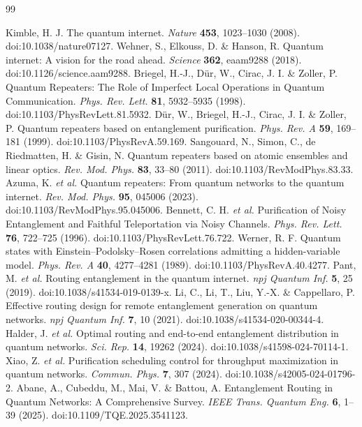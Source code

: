 \documentclass[pdflatex,sn-nature]{sn-jnl}
\theoremstyle{plain}
\theoremstyle{remark}
\begin{document}
\begin{thebibliography}{99}

 Kimble, H. J. The quantum internet. \textit{Nature} \textbf{453}, 1023--1030 (2008). doi:10.1038/nature07127.
 Wehner, S., Elkouss, D. \& Hanson, R. Quantum internet: A vision for the road ahead. \textit{Science} \textbf{362}, eaam9288 (2018). doi:10.1126/science.aam9288.
 Briegel, H.-J., D{\"u}r, W., Cirac, J. I. \& Zoller, P. Quantum Repeaters: The Role of Imperfect Local Operations in Quantum Communication. \textit{Phys. Rev. Lett.} \textbf{81}, 5932--5935 (1998). doi:10.1103/PhysRevLett.81.5932.
 D{\"u}r, W., Briegel, H.-J., Cirac, J. I. \& Zoller, P. Quantum repeaters based on entanglement purification. \textit{Phys. Rev. A} \textbf{59}, 169--181 (1999). doi:10.1103/PhysRevA.59.169.
 Sangouard, N., Simon, C., de Riedmatten, H. \& Gisin, N. Quantum repeaters based on atomic ensembles and linear optics. \textit{Rev. Mod. Phys.} \textbf{83}, 33--80 (2011). doi:10.1103/RevModPhys.83.33.
 Azuma, K. \textit{et al.} Quantum repeaters: From quantum networks to the quantum internet. \textit{Rev. Mod. Phys.} \textbf{95}, 045006 (2023). doi:10.1103/RevModPhys.95.045006.
 Bennett, C. H. \textit{et al.} Purification of Noisy Entanglement and Faithful Teleportation via Noisy Channels. \textit{Phys. Rev. Lett.} \textbf{76}, 722--725 (1996). doi:10.1103/PhysRevLett.76.722.
 Werner, R. F. Quantum states with Einstein--Podolsky--Rosen correlations admitting a hidden-variable model. \textit{Phys. Rev. A} \textbf{40}, 4277--4281 (1989). doi:10.1103/PhysRevA.40.4277.
 Pant, M. \textit{et al.} Routing entanglement in the quantum internet. \textit{npj Quantum Inf.} \textbf{5}, 25 (2019). doi:10.1038/s41534-019-0139-x.
 Li, C., Li, T., Liu, Y.-X. \& Cappellaro, P. Effective routing design for remote entanglement generation on quantum networks. \textit{npj Quantum Inf.} \textbf{7}, 10 (2021). doi:10.1038/s41534-020-00344-4.
 Halder, J. \textit{et al.} Optimal routing and end-to-end entanglement distribution in quantum networks. \textit{Sci. Rep.} \textbf{14}, 19262 (2024). doi:10.1038/s41598-024-70114-1.
 Xiao, Z. \textit{et al.} Purification scheduling control for throughput maximization in quantum networks. \textit{Commun. Phys.} \textbf{7}, 307 (2024). doi:10.1038/s42005-024-01796-2.
 Abane, A., Cubeddu, M., Mai, V. \& Battou, A. Entanglement Routing in Quantum Networks: A Comprehensive Survey. \textit{IEEE Trans. Quantum Eng.} \textbf{6}, 1--39 (2025). doi:10.1109/TQE.2025.3541123.

\end{thebibliography}
\end{document}
